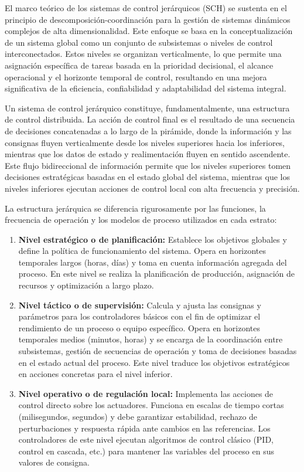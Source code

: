 El marco teórico de los sistemas de control jerárquicos (SCH) se sustenta en el principio de descomposición-coordinación para la gestión de sistemas dinámicos complejos de alta dimensionalidad. Este enfoque se basa en la conceptualización de un sistema global como un conjunto de subsistemas o niveles de control interconectados. Estos niveles se organizan verticalmente, lo que permite una asignación específica de tareas basada en la prioridad decisional, el alcance operacional y el horizonte temporal de control, resultando en una mejora significativa de la eficiencia, confiabilidad y adaptabilidad del sistema integral.

Un sistema de control jerárquico constituye, fundamentalmente, una estructura de control distribuida. La acción de control final es el resultado de una secuencia de decisiones concatenadas a lo largo de la pirámide, donde la información y las consignas fluyen verticalmente desde los niveles superiores hacia los inferiores, mientras que los datos de estado y realimentación fluyen en sentido ascendente. Este flujo bidireccional de información permite que los niveles superiores tomen decisiones estratégicas basadas en el estado global del sistema, mientras que los niveles inferiores ejecutan acciones de control local con alta frecuencia y precisión.

La estructura jerárquica se diferencia rigurosamente por las funciones, la frecuencia de operación y los modelos de proceso utilizados en cada estrato:
\begin{enumerate}

\item \textbf{Nivel estratégico o de planificación:} Establece los objetivos globales y define la política de funcionamiento del sistema. Opera en horizontes temporales largos (horas, días) y toma en cuenta información agregada del proceso. En este nivel se realiza la planificación de producción, asignación de recursos y optimización a largo plazo.

\item \textbf{Nivel táctico o de supervisión:} Calcula y ajusta las consignas y parámetros para los controladores básicos con el fin de optimizar el rendimiento de un proceso o equipo específico. Opera en horizontes temporales medios (minutos, horas) y se encarga de la coordinación entre subsistemas, gestión de secuencias de operación y toma de decisiones basadas en el estado actual del proceso. Este nivel traduce los objetivos estratégicos en acciones concretas para el nivel inferior.

\item \textbf{Nivel operativo o de regulación local:} Implementa las acciones de control directo sobre los actuadores. Funciona en escalas de tiempo cortas (milisegundos, segundos) y debe garantizar estabilidad, rechazo de perturbaciones y respuesta rápida ante cambios en las referencias. Los controladores de este nivel ejecutan algoritmos de control clásico (PID, control en cascada, etc.) para mantener las variables del proceso en sus valores de consigna.

\end{enumerate}

